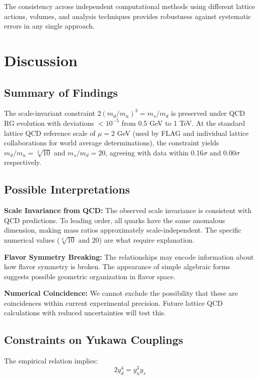 \documentclass[12pt]{article}
\begin{document}
The consistency across independent computational methods using different lattice actions, volumes, and analysis techniques provides robustness against systematic errors in any single approach.

\section{Discussion}

\subsection{Summary of Findings}

The scale-invariant constraint $2(m_d/m_u)^3 = m_s/m_d$ is preserved under QCD RG evolution with deviations $<10^{-5}$ from 0.5 GeV to 1 TeV. At the standard lattice QCD reference scale of $\mu = 2$ GeV (used by FLAG and individual lattice collaborations for world average determinations), the constraint yields $m_d/m_u = \sqrt[3]{10}$ and $m_s/m_d = 20$, agreeing with data within 0.16$\sigma$ and 0.00$\sigma$ respectively.

\subsection{Possible Interpretations}

\textbf{Scale Invariance from QCD:} The observed scale invariance is consistent with QCD predictions. To leading order, all quarks have the same anomalous dimension, making mass ratios approximately scale-independent. The specific numerical values ($\sqrt[3]{10}$ and $20$) are what require explanation.

\textbf{Flavor Symmetry Breaking:} The relationships may encode information about how flavor symmetry is broken. The appearance of simple algebraic forms suggests possible geometric organization in flavor space.

\textbf{Numerical Coincidence:} We cannot exclude the possibility that these are coincidences within current experimental precision. Future lattice QCD calculations with reduced uncertainties will test this.

\subsection{Constraints on Yukawa Couplings}

The empirical relation implies:
\begin{equation}
2y_d^4 = y_u^3 y_s
\end{equation}
\end{document}
